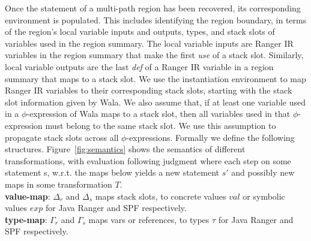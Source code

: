Once the statement of a multi-path region has been recovered, its corresponding environment is populated.
%
This includes identifying the region boundary, in terms of the region\rq s local variable inputs and outputs, types, and stack
slots of variables used in the region summary.
%
%
%
The local variable inputs are Ranger IR variables in the region summary that make the first \textit{use} of a
stack slot.
%
Similarly, local variable outputs are the last \textit{def} of a Ranger IR variable in a region summary that maps to a
stack slot.
%
%
%
We use the instantiation environment to map Ranger IR variables to their corresponding stack slots, starting with
the stack slot information given by Wala.
%
%
%
We also assume that, if at least one variable used in a $\phi$-expression of Wala maps to a stack slot, then all variables
used in that $\phi$-expression must belong to the same stack slot.
%
We use this assumption to propagate stack slots across all $\phi$-expressions.
%
%
Formally we define the following structures.
%
Figure~\ref{fig:semantics} shows the semantics of different transformations, with evaluation following judgment where
each step on some statement s, w.r.t. the maps below yields a new statement $s'$ and possibly new maps in some
transformation $T$.\\
\textbf{value-map}: $\Delta_r$ and $\Delta_s$ maps stack slots, to concrete values $val$ or symbolic values $exp$ for Java Ranger and SPF respectively.\\
\textbf{type-map}: $\Gamma_r$ and $\Gamma_s$ maps vars or references, to types $\tau$ for Java Ranger and SPF respectively.\\
